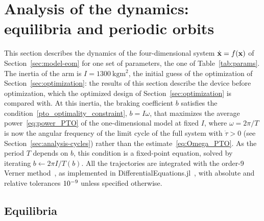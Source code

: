 \section{Analysis of the dynamics: equilibria and periodic orbits} \label{sec:analysis}

This section describes the dynamics of the four-dimensional system \(\dot{\vb x} = f(\vb x)\) of Section~\ref{sec:model-eom} for one set of parameters, the one of Table~\ref{tab:params}.
The inertia of the arm is \(I = \SI{1300}{\kilogram\meter\squared}\), the initial guess of the optimization of Section~\ref{sec:optimization}: the results of this section describe the device before optimization, which the optimized design of Section~\ref{sec:optimization} is compared with.
At this inertia, the braking coefficient \(b\) satisfies the condition~\eqref{pto_optimality_constraint}, \(b = I\omega\), that maximizes the average power~\eqref{eq:power_PTO} of the one-dimensional model at fixed \(I\), where \(\omega = 2\pi/T\) is now the angular frequency of the limit cycle of the full system with \(\dot\tau > 0\) (see Section~\ref{sec:analysis-cycles}) rather than the estimate~\eqref{eq:Omega_PTO}.
As the period \(T\) depends on \(b\), this condition is a fixed-point equation, solved by iterating \(b \leftarrow 2\pi I/T(b)\).
All the trajectories are integrated with the order-9 Verner method~\cite{Verner2010}, as implemented in DifferentialEquations.jl~\cite{rackauckas2017differentialequations}, with absolute and relative tolerances \(10^{-9}\) unless specified otherwise.

\subsection{Equilibria} \label{sec:analysis-equilibria}

